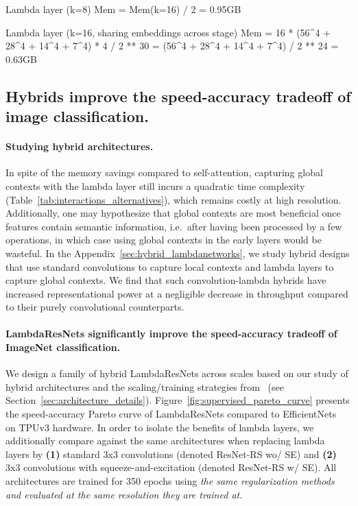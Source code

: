 \documentclass{article} \usepackage{iclr2021_conference,times}
\begin{document}
Lambda layer (k=8)
Mem = Mem(k=16) / 2 =  0.95GB

Lambda layer (k=16, sharing embeddings across stage)
Mem = 16 * (56^4 + 28^4 + 14^4 + 7^4) * 4 / 2 ** 30
    = (56^4 + 28^4 + 14^4 + 7^4) / 2 ** 24
    = 0.63GB
\fi

\subsection{Hybrids improve the speed-accuracy tradeoff of image classification.\label{sec:hybrid_lambdanetworks}}

\vspace{-0.1cm}
\paragraph{Studying hybrid architectures.}
In spite of the memory savings compared to self-attention, capturing global contexts with the lambda layer still incurs a quadratic time complexity (Table~\ref{tab:interactions_alternatives}), which remains costly at high resolution. 
Additionally, one may hypothesize that global contexts are most beneficial once features contain semantic information, i.e.\ after having been processed by a few operations, in which case using global contexts in the early layers would be wasteful.
In the Appendix~\ref{sec:hybrid_lambdanetworks}, we study hybrid designs that use standard convolutions to capture local contexts and lambda layers to capture global contexts.
We find that such convolution-lambda hybrids have increased representational power at a negligible decrease in throughput compared to their purely convolutional counterparts.

\vspace{-0.1cm}
\paragraph{LambdaResNets significantly improve the speed-accuracy tradeoff of ImageNet classification.}
We design a family of hybrid LambdaResNets across scales based on our study of hybrid architectures and the scaling/training strategies from~\cite{bello2021revisiting} (see Section~\ref{sec:architecture_details}).
Figure~\ref{fig:supervised_pareto_curve} presents the speed-accuracy Pareto curve of LambdaResNets compared to EfficientNets~\citep{tan2019efficientnet} on TPUv3 hardware.
In order to isolate the benefits of lambda layers, we additionally compare against the same architectures when replacing lambda layers by \textbf{(1)} standard 3x3 convolutions (denoted ResNet-RS wo/ SE) and \textbf{(2)} 3x3 convolutions with squeeze-and-excitation (denoted ResNet-RS w/ SE).
All architectures are trained for 350 epochs using \emph{the same regularization methods and evaluated at the same resolution they are trained at}.
\end{document}
